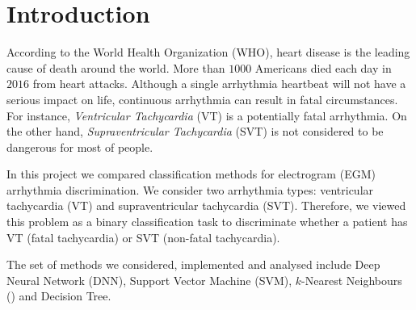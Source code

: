 \section{Introduction}
\label{sec:intro}

According to the World Health Organization (WHO), heart disease is 
the leading cause of death around the world.
More than $1000$ Americans died each day in $2016$ from heart 
attacks. 
Although a single arrhythmia heartbeat will not have a serious impact 
on life, continuous arrhythmia can result in fatal circumstances.
For instance, \textit{Ventricular Tachycardia} (VT) is a potentially 
fatal arrhythmia. 
On the other hand, \textit{Supraventricular Tachycardia} (SVT)
is not considered to be dangerous for most of people. 

In this project we compared classification methods for 
electrogram (EGM) arrhythmia discrimination. We consider two 
arrhythmia types: ventricular tachycardia (VT) and supraventricular 
tachycardia (SVT). Therefore, we viewed this problem as a
binary classification task to discriminate whether a patient has VT 
(fatal tachycardia) or SVT (non-fatal tachycardia).

The set of methods we considered, implemented and
analysed include Deep Neural Network (DNN), Support Vector Machine 
(SVM), $k$-Nearest Neighbours (\knn) and Decision Tree.


